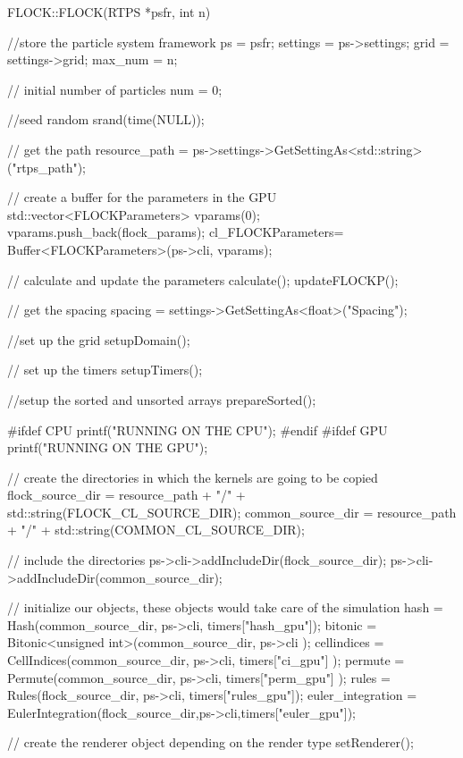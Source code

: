 \begin{cppcode}{0}
FLOCK::FLOCK(RTPS *psfr, int n)
 {
 	//store the particle system framework
 	ps = psfr;
	settings = ps->settings;
	grid = settings->grid;
	max_num = n;
	
	// initial number of particles
	num = 0;
 
 	//seed random
 	srand(time(NULL));
 
 	// get the path 
	resource_path = ps->settings->GetSettingAs<std::string>("rtps_path");

	// create a buffer for the parameters in the GPU
	std::vector<FLOCKParameters> vparams(0);
	vparams.push_back(flock_params);
	cl_FLOCKParameters= Buffer<FLOCKParameters>(ps->cli, vparams);
 
 	// calculate and update the parameters
	calculate();
	updateFLOCKP();

	// get the spacing
	spacing = settings->GetSettingAs<float>("Spacing");
	
	//set up the grid
	setupDomain();
	
	// set up the timers
	setupTimers();
	
	//setup the sorted and unsorted arrays
	prepareSorted();
 	 
#ifdef CPU
	printf("RUNNING ON THE CPU\n");
#endif
#ifdef GPU
	printf("RUNNING ON THE GPU\n");
	
	// create the directories in which the kernels are going to be copied
	flock_source_dir = resource_path + "/" + std::string(FLOCK_CL_SOURCE_DIR);
	common_source_dir = resource_path + "/" + std::string(COMMON_CL_SOURCE_DIR);
	
	// include the directories
	ps->cli->addIncludeDir(flock_source_dir);
	ps->cli->addIncludeDir(common_source_dir);
	
	// initialize our objects, these objects would take care of the simulation
	hash = Hash(common_source_dir, ps->cli, timers["hash_gpu"]);
	bitonic = Bitonic<unsigned int>(common_source_dir, ps->cli );
	cellindices = CellIndices(common_source_dir, ps->cli, timers["ci_gpu"] );
	permute = Permute(common_source_dir, ps->cli, timers["perm_gpu"] );
	rules = Rules(flock_source_dir, ps->cli, timers["rules_gpu"]);
	euler_integration = EulerIntegration(flock_source_dir,ps->cli,timers["euler_gpu"]);
		
	// create the renderer object depending on the render type		
	setRenderer(); 
}
\end{cppcode}

